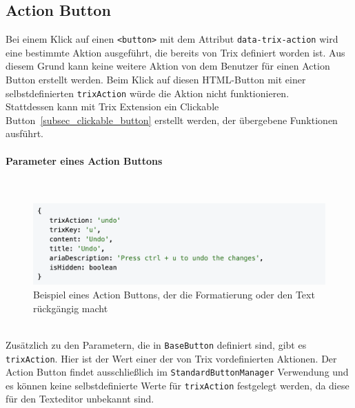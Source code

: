 \subsection{Action Button}
\label{subsec_action_button}

Bei einem Klick auf einen \texttt{<button>} mit dem Attribut \texttt{data-trix-action} wird eine bestimmte Aktion ausgeführt, die
bereits von Trix definiert worden ist. Aus diesem Grund kann keine weitere Aktion von dem Benutzer für einen Action Button erstellt 
werden. Beim Klick auf diesen HTML-Button mit einer selbstdefinierten \texttt{trixAction} würde die Aktion nicht funktionieren. \\
Stattdessen kann mit Trix Extension ein Clickable Button~\ref{subsec_clickable_button} erstellt werden, der übergebene 
Funktionen ausführt. 

\paragraph{Parameter eines Action Buttons}\mbox{}\\
\begin{figure}[H]
\begin{center}
	\includegraphics[scale=.7]{images/action-button.png}
\end{center}
	\caption{Beispiel eines Action Buttons, der die Formatierung oder den Text rückgängig macht}
\end{figure}

\mbox{}\\
Zusätzlich zu den Parametern, die in \texttt{BaseButton} definiert sind, gibt es \texttt{trixAction}. Hier ist der Wert einer der von Trix
vordefinierten Aktionen. Der Action Button findet ausschließlich im \texttt{StandardButtonManager} Verwendung und es können
keine selbstdefinierte Werte für \texttt{trixAction} festgelegt werden, da diese für den Texteditor unbekannt sind.

\newpage
